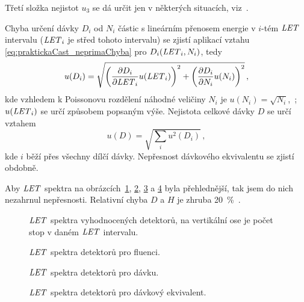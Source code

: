 Třetí složka nejistot $u_3$ se dá určit jen v některých situacích, viz~\cite{nejistoty}.

Chyba určení dávky $D_i$ od $N_i$ částic s lineárním přenosem energie v $i$-tém $\mathit{LET}$ intervalu ($\mathit{LET}_i$ je střed tohoto intervalu) se zjistí aplikací vztahu \eqref{eq:praktickaCast_neprimaChyba} pro $D_i(\mathit{LET}_i,N_i)$, tedy 
\begin{equation}
  u(D_i)=\sqrt{\left(\frac{\partial D_i}{\partial\mathit{LET}_i}u(\mathit{LET}_i)\right)^2+\left(\frac{\partial D_i}{\partial N_i}u(N_i)\right)^2}\,,
  \label{eq:praktickaCast_chybaDavka}
\end{equation}
kde vzhledem k Poissonovu rozdělení náhodné veličiny $N_i$ je $u(N_i)=\sqrt{N_i}$,~\cite{thesisKPBrabcova}; $u(\mathit{LET}_i)$ se určí způsobem popsaným výše. Nejistota celkové dávky $D$ se určí vztahem
\begin{equation}
  u(D)=\sqrt{\sum_i u^2(D_i)}\,,
  \label{eq:praktickaCast_chybaCelkDavka}
\end{equation}
kde $i$ běží přes všechny dílčí dávky. Nepřesnost dávkového ekvivalentu se zjistí obdobně.

Aby $\mathit{LET}$ spektra na obrázcích~\ref{fig:praktickaCast_LETcetnost}, \ref{fig:praktickaCast_LETfluence}, \ref{fig:praktickaCast_LETdavka} a \ref{fig:praktickaCast_LETdavkEkvivalent} byla přehlednější, tak jsem do nich nezahrnul nepřesnosti. Relativní chyba $D$ a $H$ je zhruba 20~\%~\cite{nejistoty}.
\begin{figure}[H]
  \centering
	\centering
	
	\caption{$\mathit{LET}$ spektra vyhodnocených detektorů, na vertikální ose je počet stop v daném $\mathit{LET}$ intervalu.}
	\label{fig:praktickaCast_LETcetnost}
\end{figure}
\begin{figure}[H]
  \centering
	\centering
	
	\caption{$\mathit{LET}$ spektra detektorů pro fluenci.}
	\label{fig:praktickaCast_LETfluence}
\end{figure}
\begin{figure}[H]
  \centering
	\centering
	
	\caption{$\mathit{LET}$ spektra detektorů pro dávku.}
	\label{fig:praktickaCast_LETdavka}
\end{figure}
\begin{figure}[H]
  \centering
	\centering
	
	\caption{$\mathit{LET}$ spektra detektorů pro dávkový ekvivalent.}
	\label{fig:praktickaCast_LETdavkEkvivalent}
\end{figure}

